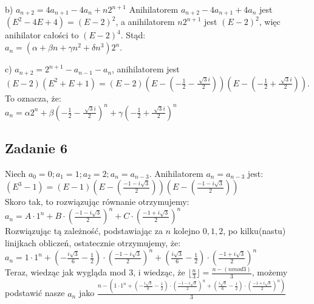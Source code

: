 \documentclass[a4paper]{article}
\begin{document}
b) $a_{n+2}=4a_{n+1}-4a_n+n2^{n+1}$
Anihilatorem $a_{n+2}-4a_{n+1}+4a_n$ jest $(E^2-4E+4)=(E-2)^2$, a anihilatorem $n2^{n+1}$ jest $(E-2)^2$, więc anihilator całości to $(E-2)^4$. Stąd:\\
$a_n=(\alpha + \beta n + \gamma n^2 + \delta n^3)2^n$.

c) $a_{n+2} = 2^{n+1} - a_{n-1} - a_n$, anihilatorem jest $(E-2)(E^2 + E + 1) = (E-2)(E-(-\frac{1}{2}-\frac{\sqrt[]{3} i}{2}))(E-(-\frac{1}{2}+\frac{\sqrt[]{3} i}{2}))$. To oznacza, że:\\
$a_n=\alpha 2^n + \beta (-\frac{1}{2}-\frac{\sqrt[]{3} i}{2})^n + \gamma (-\frac{1}{2}+\frac{\sqrt[]{3} i}{2})^n$

\subsection*{Zadanie 6}
Niech $a_0=0; a_1=1; a_2=2; a_n=a_{n-3}$. Anihilatorem $a_n=a_{n-3}$ jest:\\
$(E^3-1)=(E-1)(E-(\frac{-1-i\sqrt{3}}{2}))(E-(\frac{-1-i\sqrt{3}}{2}))$\\
Skoro tak, to rozwiązując równanie otrzymujemy:\\
$a_n=A\cdot 1^n + B\cdot (\frac{-1-i\sqrt{3}}{2})^n + C\cdot (\frac{-1+i\sqrt{3}}{2})^n$\\
Rozwiązując tą zależność, podstawiając za $n$ kolejno $0,1,2$, po kilku(nastu) linijkach obliczeń, ostatecznie otrzymujemy, że:\\
\Large$a_n=1\cdot 1^n + (-\frac{i\sqrt{3}}{6}-\frac{1}{2})\cdot (\frac{-1-i\sqrt{3}}{2})^n + (\frac{i\sqrt{3}}{6}-\frac{1}{2})\cdot (\frac{-1+i\sqrt{3}}{2})^n$\normalsize \\
Teraz, wiedząc jak wygląda mod 3, i wiedząc, że $\lfloor \frac{n}{3} \rfloor = \frac{n- (n mod 3)}{3}$, możemy podstawić nasze $a_n$ jako \Large$\frac{n- (1\cdot 1^n + (-\frac{i\sqrt{3}}{6}-\frac{1}{2})\cdot (\frac{-1-i\sqrt{3}}{2})^n + (\frac{i\sqrt{3}}{6}-\frac{1}{2})\cdot (\frac{-1+i\sqrt{3}}{2})^n)}{3} $\normalsize 
\end{document}
